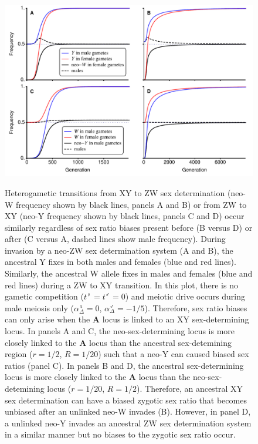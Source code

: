 \documentclass[12pt]{article}
\begin{document}
\begin{figure}[!h]
\centering
\includegraphics[width=\linewidth]{Combination_Turnover}\\
\caption{
Heterogametic transitions from XY to ZW sex determination (neo-W frequency shown by black lines, panels A and B) or from ZW to XY (neo-Y frequency shown by black lines, panels C and D) occur similarly regardless of sex ratio biases present before (B versus D) or after (C versus A, dashed lines show male frequency). 
During invasion by a neo-ZW sex determination system (A and B), the ancestral Y fixes in both males and females (blue and red lines). 
Similarly, the ancestral W allele fixes in males and females (blue and red lines) during a ZW to XY transition. 
In this plot, there is no gametic competition ($t^\female=t^\male=0$) and meiotic drive occurs during male meiosis only ($\alpha^\female_{\Delta}=0$, $\alpha^\male_{\Delta}=-1/5$). Therefore, sex ratio biases can only arise when the \textbf{A} locus is linked to an XY sex-determining locus.
In panels A and C, the neo-sex-determining locus is more closely linked to the \textbf{A} locus than the ancestral sex-detemining region ($r=1/2$, $R=1/20$) such that a neo-Y can caused biased sex ratios (panel C).
In panels B and D, the ancestral sex-determining locus is more closely linked to the \textbf{A} locus than the neo-sex-detemining locus ($r=1/20$, $R=1/2$). 
Therefore, an ancestral XY sex determination can have a biased zygotic sex ratio that becomes unbiased after an unlinked neo-W invades (B). 
However, in panel D, a unlinked neo-Y invades an ancestral ZW sex determination system in a similar manner but no biases to the zygotic sex ratio occur. 
}
\end{figure}
\end{document}
